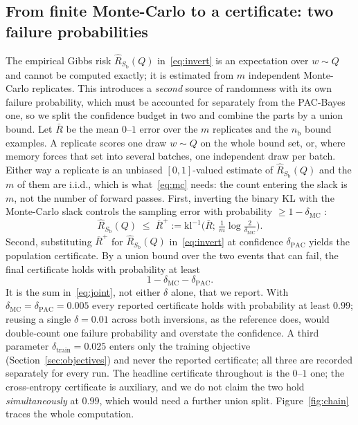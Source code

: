 \subsection{From finite Monte-Carlo to a certificate: two failure
probabilities}\label{sec:confidence}

The empirical Gibbs risk $\hat{R}_{S_{\mathrm b}}(Q)$ in~\eqref{eq:invert} is an
expectation over $w\sim Q$ and cannot be computed exactly; it is estimated from
$m$ independent Monte-Carlo replicates. This introduces a \emph{second} source of
randomness with its own failure probability, which must be accounted for
separately from the PAC-Bayes one, so we split the confidence budget in two and
combine the parts by a union bound. Let $\bar{R}$ be the mean $0$--$1$
error over the $m$ replicates and the $n_{\mathrm b}$ bound examples. A replicate
scores one draw $w\sim Q$ on the whole bound set, or, where memory forces that set
into several batches, one independent draw per batch. Either way a replicate is an
unbiased $[0,1]$-valued estimate of $\hat{R}_{S_{\mathrm b}}(Q)$ and the $m$ of
them are i.i.d., which is what~\eqref{eq:mc} needs: the count entering the slack is
$m$, not the number of forward passes. First, inverting
the binary KL with the Monte-Carlo slack controls the sampling error with
probability $\ge 1-\delta_{\mathrm{MC}}$ \parencite{langford2001}:
\begin{equation}\label{eq:mc}
\hat{R}_{S_{\mathrm b}}(Q)\;\le\;\overline{R}^{+}:=\mathrm{kl}^{-1}\!\Big(\bar{R};\,
\tfrac{1}{m}\log\tfrac{2}{\delta_{\mathrm{MC}}}\Big).
\end{equation}
Second, substituting $\overline{R}^{+}$ for $\hat{R}_{S_{\mathrm b}}(Q)$
in~\eqref{eq:invert} at confidence $\delta_{\mathrm{PAC}}$ yields the
population certificate. By a union bound over the two events that can fail,
the final certificate holds with probability at least
\begin{equation}\label{eq:joint}
1-\delta_{\mathrm{MC}}-\delta_{\mathrm{PAC}}.
\end{equation}
It is the sum in~\eqref{eq:joint}, not either $\delta$ alone, that we report.
With $\delta_{\mathrm{MC}}=\delta_{\mathrm{PAC}}=0.005$ every reported
certificate holds with probability at least $0.99$; reusing a single $\delta=0.01$
across both inversions, as the reference does, would double-count one failure
probability and overstate the confidence. A third parameter
$\delta_{\mathrm{train}}=0.025$ enters only the training objective
(Section~\ref{sec:objectives}) and never the reported certificate; all three are
recorded separately for every run. The headline certificate throughout is the
$0$--$1$ one; the cross-entropy certificate is auxiliary, and we do not claim the
two hold \emph{simultaneously} at $0.99$, which would need a further union split.
Figure~\ref{fig:chain} traces the whole computation.

